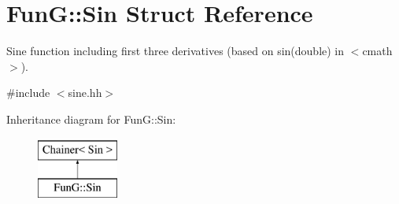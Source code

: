 \hypertarget{structFunG_1_1Sin}{}\section{FunG\+:\+:Sin Struct Reference}
\label{structFunG_1_1Sin}


Sine function including first three derivatives (based on sin(double) in $<$cmath$>$).  




{\ttfamily \#include $<$sine.\+hh$>$}

Inheritance diagram for FunG\+:\+:Sin\+:\begin{figure}[H]
\begin{center}
\leavevmode
\includegraphics[height=2.000000cm]{structFunG_1_1Sin}
\end{center}
\end{figure}
